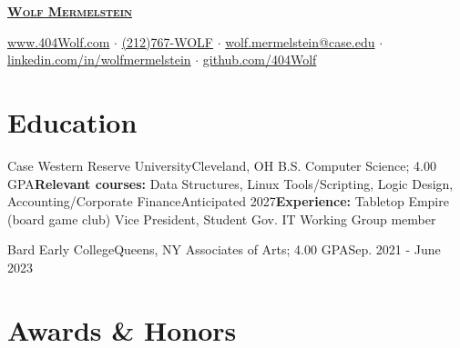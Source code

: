 \documentclass[letterpaper, 10pt]{article}
\begin{document}


\begin{center}
	\textbf{\Huge \scshape \href{https://404wolf.com}{Wolf Mermelstein}} \\ \vspace{4pt}

	\href{https://404wolf.com}{www.404Wolf.com}
	$\cdot$
	\small \href{tel:(+12127679653)}{(212)767-WOLF}
	$\cdot$
	\href{mailto:wolf.mermelstein@case.edu}{wolf.mermelstein@case.edu}
	$\cdot$
	\href{https://linkedin.com/in/wolfmermelstein}{linkedin.com/in/wolfmermelstein}
	$\cdot$
	\href{https://github.com/404wolf}{github.com/404Wolf}
\end{center}
\vspace{-16px}

\section{Education}
\resumeSubHeadingListStart
\resumeSubheading
{Case Western Reserve University}{Cleveland, OH}
{B.S. Computer Science; 4.00 GPA}{\textbf{Relevant courses:} Data Structures, Linux Tools/Scripting, Logic Design, Accounting/Corporate Finance}{Anticipated 2027}{\textbf{Experience:} Tabletop Empire (board game club) Vice President, Student Gov. IT Working Group member}

\vspace{3pt}

\resumeSubheading
{Bard Early College}{Queens, NY}{}
{Associates of Arts;  4.00 GPA}{Sep. 2021 - June 2023}{}
\resumeSubHeadingListEnd

\vspace{-7pt}

\section{Awards \& Honors}
\resumeSubHeadingListStart

\end{document}
